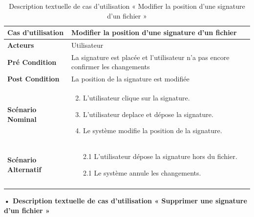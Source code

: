 \begin{longtable}{|p{5cm}|p{10cm}|}
\hline
\textbf{Cas d'utilisation}&Modifier la position d'une signature d'un fichier\\
\hline
\textbf{Acteurs}&Utilisateur\\
\hline
\textbf{Pré Condition}&La signature est placée et l'utilisateur n'a pas encore confirmer les changements\\
\hline
\textbf{Post Condition}&La position de la signature est modifiée\\
\hline
\textbf{Scénario Nominal}&
\vspace{-\baselineskip}
\begin{enumerate}
    \setcounter{enumi}{1}
    \item L'utilisateur clique sur la signature.
    \item L'utilisateur deplace et dépose la signature.
    \item Le système modifie la position de la signature.
\end{enumerate}\\
\hline
\textbf{Scénario Alternatif}&
\vspace{-\baselineskip}
\begin{enumerate}
    \item [2.1]L'utilisateur dépose la signature hors du fichier.
    \item [2.1]Le système annule les changements.
\end{enumerate}\\
\hline
\caption{Description textuelle de cas d'utilisation « Modifier la position d'une signature d'un fichier »}
\label{tab:description-textuelle-de-cas-d-utilisation-modifier-la-position-d-une-signature-d-un-fichier}
\end{longtable}

\textbf{•	Description textuelle de cas d'utilisation « Supprimer une signature d'un fichier  »}

